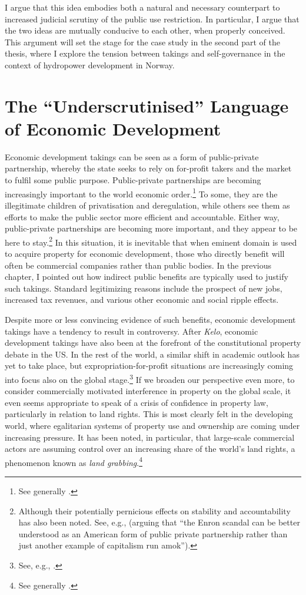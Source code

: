 I argue that this idea embodies both a natural and necessary counterpart to increased judicial scrutiny of the public use restriction. In particular, I argue that the two ideas are mutually conducive to each other, when properly conceived. This argument will set the stage for the case study in the second part of the thesis, where I explore the tension between takings and self-governance in the context of hydropower development in Norway.

\section{The ``Underscrutinised'' Language of Economic Development}\label{sec:lgppp}

Economic development takings can be seen as a form of public-private partnership, whereby the state seeks to rely on for-profit takers and the market to fulfil some public purpose. Public-private partnerships are becoming increasingly important to the world economic order.\footnote{See generally \cite{saussier13}.} To some, they are the illegitimate children of privatisation and deregulation, while others see them as efforts to make the public sector more efficient and accountable. Either way, public-private partnerships are becoming more important, and they appear to be here to stay.\footnote{Although their potentially pernicious effects on stability and accountability has also been noted. See, e.g., \cite{baker03} (arguing that ``the Enron scandal can be better understood as an American form of public private partnership rather than just another example of capitalism run amok'').} In this situation, it is inevitable that when eminent domain is used to acquire property for economic development, those who directly benefit will often be commercial companies rather than public bodies. In the previous chapter, I pointed out how indirect public benefits are typically used to justify such takings. Standard legitimizing reasons include the prospect of new jobs, increased tax revenues, and various other economic and social ripple effects. 

Despite more or less convincing evidence of such benefits, economic development takings have a tendency to result in controversy. After {\it Kelo}, economic development takings have also been at the forefront of the constitutional property debate in the US. In the rest of the world, a similar shift in academic outlook has yet to take place, but expropriation-for-profit situations are increasingly coming into focus also on the global stage.\footnote{See, e.g., \cite{gray11,waring13,verstappen14}.} If we broaden our perspective even more, to consider commercially motivated interference in property on the global scale, it even seems appropriate to speak of a crisis of confidence in property law, particularly in relation to land rights. This is most clearly felt in the developing world, where egalitarian systems of property use and ownership are coming under increasing pressure. It has been noted, in particular, that large-scale commercial actors are assuming control over an increasing share of the world's land rights, a phenomenon known as {\it land grabbing}.\footnote{See generally \cite{borras11}.} 

